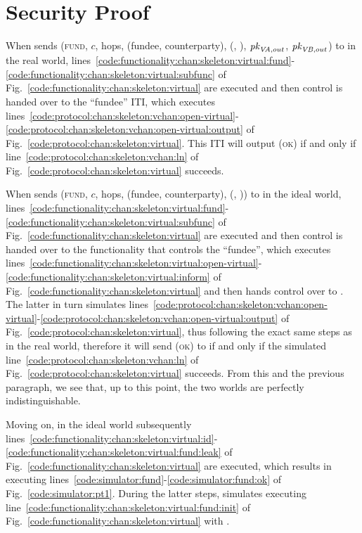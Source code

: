 \section{Security Proof}
  When \environment sends (\textsc{fund}, $c$, hops, (fundee, counterparty),
  (\charlie, \dave), $\textit{pk}_{\mathit{VA}, out}$, $\textit{pk}_{\mathit{VB}, out}$) to \alice
  in the real world,
  lines~\ref{code:functionality:chan:skeleton:virtual:fund}-\ref{code:functionality:chan:skeleton:virtual:subfunc}
  of Fig.~\ref{code:functionality:chan:skeleton:virtual} are executed and then
  control is handed over to the ``fundee'' ITI, which executes
  lines~\ref{code:protocol:chan:skeleton:vchan:open-virtual}-\ref{code:protocol:chan:skeleton:vchan:open-virtual:output}
  of Fig.~\ref{code:protocol:chan:skeleton:virtual}.  This ITI will output
  (\textsc{ok}) if and only if line~\ref{code:protocol:chan:skeleton:vchan:ln}
  of Fig.~\ref{code:protocol:chan:skeleton:virtual} succeeds.

  When \environment sends (\textsc{fund}, $c$, hops, (fundee, counterparty),
  (\charlie, \dave)) to \alice in the ideal world,
  lines~\ref{code:functionality:chan:skeleton:virtual:fund}-\ref{code:functionality:chan:skeleton:virtual:subfunc}
  of Fig.~\ref{code:functionality:chan:skeleton:virtual} are executed and then
  control is handed over to the functionality that controls the ``fundee'',
  which executes
  lines~\ref{code:functionality:chan:skeleton:virtual:open-virtual}-\ref{code:functionality:chan:skeleton:virtual:inform}
  of Fig.~\ref{code:functionality:chan:skeleton:virtual} and then hands control
  over to \simulator. The latter in turn simulates
  lines~\ref{code:protocol:chan:skeleton:vchan:open-virtual}-\ref{code:protocol:chan:skeleton:vchan:open-virtual:output}
  of Fig.~\ref{code:protocol:chan:skeleton:virtual}, thus following the exact
  same steps as in the real world, therefore it will send (\textsc{ok}) to
  \fchan if and only if the simulated
  line~\ref{code:protocol:chan:skeleton:vchan:ln} of
  Fig.~\ref{code:protocol:chan:skeleton:virtual} succeeds. From this and the
  previous paragraph, we see that, up to this point, the two worlds are
  perfectly indistinguishable.

  Moving on, in the ideal world subsequently
  lines~\ref{code:functionality:chan:skeleton:virtual:id}-\ref{code:functionality:chan:skeleton:virtual:fund:leak}
  of Fig.~\ref{code:functionality:chan:skeleton:virtual} are executed, which
  results in \simulator executing
  lines~\ref{code:simulator:fund}-\ref{code:simulator:fund:ok} of
  Fig.~\ref{code:simulator:pt1}. During the latter steps, \simulator simulates
  executing line~\ref{code:functionality:chan:skeleton:virtual:fund:init} of
  Fig.~\ref{code:functionality:chan:skeleton:virtual} with \alice.

